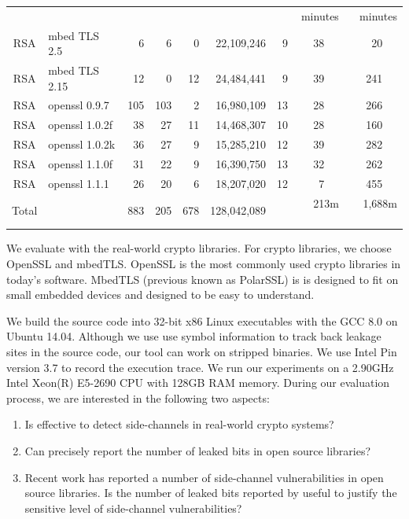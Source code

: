 \begin{table}
\begin{tabular}{clrrrrrrr}
&&&&&&& minutes & minutes\\\cline{8-9}
RSA & mbed TLS 2.5   & 6 & 6 & 0 & 22,109,246 & 9      & 38 ~~& 20  ~~\\
RSA & mbed TLS 2.15  & 12 & 0 & 12 & 24,484,441 & 9    & 39 ~~& 241  ~~\\
RSA & openssl 0.9.7  & 105 & 103 & 2 & 16,980,109 & 13 & 28 ~~& 266 ~~\\
RSA & openssl 1.0.2f & 38 & 27 & 11 & 14,468,307 & 10  & 28 ~~& 160  ~~\\
RSA & openssl 1.0.2k & 36 & 27 & 9 & 15,285,210 & 12   & 39 ~~& 282   ~~\\
RSA & openssl 1.1.0f & 31 & 22 & 9 & 16,390,750 & 13   & 32 ~~& 262 ~~\\
RSA & openssl 1.1.1  & 26 & 20 & 6 & 18,207,020 & 12   &  7 ~~& 455 ~~\\\hline
Total &              & 883 &205& 678& 128,042,089&     & 213m    ~~& 1,688m ~~\\\hline
\end{tabular}
\end{table}

We evaluate \tool{} with the real-world crypto libraries. 
For crypto libraries, we choose OpenSSL and mbedTLS. 
OpenSSL is the most commonly used
crypto libraries in today's software. 
MbedTLS (previous known as PolarSSL) is is designed to 
fit on small embedded devices and designed to be easy to 
understand.


We build the source code into 32-bit x86 Linux executables with the 
GCC 8.0 on Ubuntu 14.04. Although we use use symbol information to track
back leakage sites in the source code, our tool can
work on stripped binaries. We use Intel Pin version 3.7 
to record the execution trace. We run our experiments on a 2.90GHz
Intel Xeon(R) E5-2690 CPU with 128GB RAM memory.
During our evaluation process, we are interested in the following two
aspects:
\begin{enumerate}
    \item  Is \tool{} effective to detect side-channels in real-world
    crypto systems?
    \item  Can \tool{} precisely
    report the number of leaked bits in open source libraries?
    \item  Recent work has reported a number
    of side-channel vulnerabilities in open source libraries. 
    Is the number of leaked bits reported by \tool{} useful to justify 
    the sensitive level of side-channel vulnerabilities?
   
\end{enumerate}

